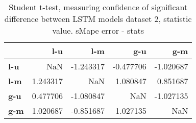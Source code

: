 \begin{table}[H]
\centering
\caption{Student t-test, measuring confidence of significant difference between LSTM models dataset 2, statistic value. sMape error - stats}
\label{table:ttest-stats-lstm-experiments-sMAPE-dataset-2}
\begin{tabular}{lrrrr}
\toprule
{} &       l-u &       l-m &       g-u &       g-m \\
\midrule
\textbf{l-u} &       NaN & -1.243317 & -0.477706 & -1.020687 \\
\textbf{l-m} &  1.243317 &       NaN &  1.080847 &  0.851687 \\
\textbf{g-u} &  0.477706 & -1.080847 &       NaN & -1.027135 \\
\textbf{g-m} &  1.020687 & -0.851687 &  1.027135 &       NaN \\
\bottomrule
\end{tabular}
\end{table}
